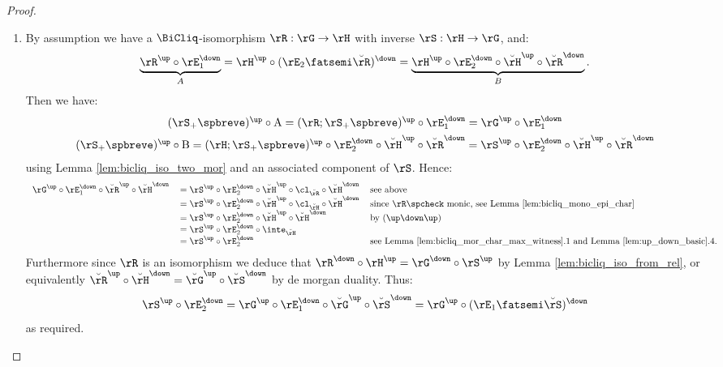 \documentclass{article}
\begin{document}
\begin{proof}
\item
\begin{enumerate}
\item
By assumption we have a $\BiCliq$-isomorphism $\rR : \rG \to \rH$ with inverse $\rS : \rH \to \rG$, and:
\[
\underbrace{\rR^\up \circ \rE_1^\down}_A
= \rH^\up \circ (\rE_2 \fatsemi \breve{\rR})^\down
= \underbrace{\rH^\up \circ \rE_2^\down \circ \breve{\rH}^\up \circ \breve{\rR}^\down}_B.
\]
Then we have:
\[
\begin{tabular}{c}
$(\rS_+\spbreve)^\up \circ \mathrm{A}
= (\rR ; \rS_+\spbreve)^\up \circ \rE_1^\down
= \rG^\up \circ \rE_1^\down$
\\[1ex]
$(\rS_+\spbreve)^\up \circ \mathrm{B}
= (\rH;\rS_+\spbreve)^\up \circ \rE_2^\down \circ \breve{\rH}^\up \circ \breve{\rR}^\down
= \rS^\up \circ \rE_2^\down \circ \breve{\rH}^\up \circ \breve{\rR}^\down$
\end{tabular}
\]
using Lemma \ref{lem:bicliq_iso_two_mor} and an associated component of $\rS$. Hence:
\[
\begin{tabular}{lll}
$\rG^\up \circ \rE_1^\down \circ \breve{\rR}^\up \circ \breve{\rH}^\down$
&
$= \rS^\up \circ \rE_2^\down \circ \breve{\rH}^\up \circ \cl_{\breve{\rR}} \circ \breve{\rH}^\down$
& see above
\\&
$= \rS^\up \circ \rE_2^\down \circ \breve{\rH}^\up \circ \cl_{\breve{\rH}} \circ \breve{\rH}^\down$
& since $\rR\spcheck$ monic, see Lemma \ref{lem:bicliq_mono_epi_char}
\\&
$= \rS^\up \circ \rE_2^\down \circ \breve{\rH}^\up \circ \breve{\rH}^\down$
& by $(\up\down\up)$
\\&
$= \rS^\up \circ \rE_2^\down \circ \inte_{\breve{\rH}}$
\\&
$= \rS^\up \circ \rE_2^\down$
& see Lemma \ref{lem:bicliq_mor_char_max_witness}.1 and Lemma \ref{lem:up_down_basic}.4.
\end{tabular}
\]
Furthermore since $\rR$ is an isomorphism we deduce that $\rR^\down \circ \rH^\up = \rG^\down \circ \rS^\up$ by Lemma \ref{lem:bicliq_iso_from_rel}, or equivalently $\breve{\rR}^\up \circ \breve{\rH}^\down = \breve{\rG}^\up \circ \breve{\rS}^\down$ by de morgan duality. Thus:
\[
\rS^\up \circ \rE_2^\down
= \rG^\up \circ \rE_1^\down \circ \breve{\rG}^\up \circ \breve{\rS}^\down
= \rG^\up \circ (\rE_1 \fatsemi \breve{\rS})^\down
\]
as required.


\end{enumerate}
\end{proof}
\end{document}
